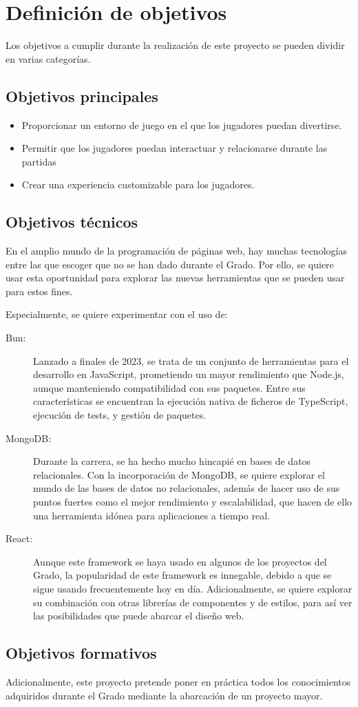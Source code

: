 \chapter{Definici\'on de objetivos}\label{defobjetivos}

Los objetivos a cumplir durante la realización de este proyecto se pueden	
dividir en varias categorías.

\section{Objetivos principales}

\begin{itemize}
  \item Proporcionar un entorno de juego en el que los jugadores
    puedan divertirse.
  \item Permitir que los jugadores puedan interactuar y relacionarse
    durante las partidas
  \item Crear una experiencia customizable para los jugadores.
\end{itemize}

\section{Objetivos técnicos}
En el amplio mundo de la programación de páginas web, hay
muchas tecnologías entre las que escoger que no se han dado
durante el Grado. 
Por ello, se quiere usar esta oportunidad para
explorar las nuevas herramientas que se pueden usar para estos fines.

Especialmente, se quiere experimentar con el uso de:
\begin{description}
  \item[Bun:] Lanzado a finales de 2023, se trata de un conjunto
    de herramientas para el desarrollo en JavaScript, prometiendo
    un mayor rendimiento que Node.js, aunque manteniendo compatibilidad con
    sus paquetes. Entre sus características se encuentran la ejecución nativa
    de ficheros de TypeScript, ejecución de tests, y gestión de paquetes.
  
  \item[MongoDB:] Durante la carrera, se ha hecho mucho hincapié en bases de datos
    relacionales. Con la incorporación de MongoDB, se quiere explorar el mundo
    de las bases de datos no relacionales, además de hacer uso de sus puntos
    fuertes como el mejor rendimiento y escalabilidad, que hacen de ello una herramienta
    idónea para aplicaciones a tiempo real.
  
  \item[React:] Aunque este framework se haya usado en algunos de los proyectos
    del Grado, la popularidad de este framework es innegable, debido a que se sigue usando
    frecuentemente hoy en día. Adicionalmente, se quiere explorar su combinación con
    otras librerías de componentes y de estilos, para así ver las posibilidades
    que puede abarcar el diseño web.
\end{description}

\section{Objetivos formativos}
Adicionalmente, este proyecto pretende poner en práctica todos
los conocimientos adquiridos durante el Grado mediante la
abarcación de un proyecto mayor.


